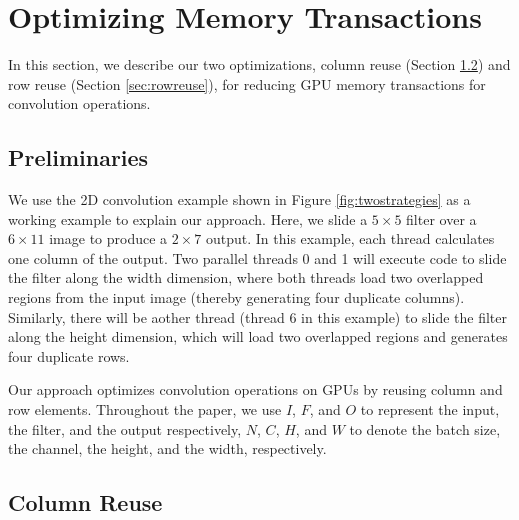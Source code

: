 \section{Optimizing Memory Transactions}
\label{sec:strategies} In this section, we describe our two optimizations, column reuse (Section \ref{sec:creuse}) and row reuse (Section
\ref{sec:rowreuse}), for reducing GPU memory transactions for convolution operations.

\subsection{Preliminaries}
 We use the 2D convolution example shown in Figure \ref{fig:twostrategies} as a working example to explain our
approach. Here, we slide a $5 \times 5$ filter over a $6 \times 11$ image to produce a $2 \times 7$ output. In this example, each thread
calculates one column of the output. Two parallel threads 0 and 1 will execute code to slide the filter along the width dimension, where
both threads load two overlapped regions from the input image (thereby generating four duplicate columns). Similarly, there will be aother
thread (thread 6 in this example) to slide the filter along the height dimension, which will load two overlapped regions and generates four
duplicate rows.



 Our approach optimizes convolution operations on GPUs by reusing column and row elements. Throughout the paper, we use
$I$, $F$, and $O$ to represent the input, the filter, and the output respectively, $N$, $C$, $H$, and $W$ to denote the batch size, the
channel, the height, and the width, respectively.

\subsection{Column Reuse}
\label{sec:creuse}

